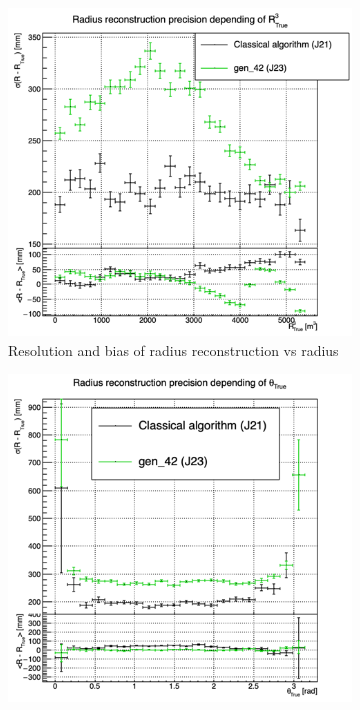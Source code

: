 \documentclass[../main.tex]{subfiles}
\begin{document}
\begin{figure}[ht]
  \begin{subfigure}[t]{0.32\linewidth}
    \centering
    \includegraphics[width=\linewidth]{images/jcnn/vic_cnn/multi_vic_42_MSBvRTC.png}
    \caption{Resolution and bias of radius reconstruction vs radius}
    \label{fig:jcnn:vic_cnn:multi_vic_42_MSBvRTC}
  \end{subfigure}
  \begin{subfigure}[t]{0.32\linewidth}
    \centering
    \includegraphics[width=\linewidth]{images/jcnn/vic_cnn/multi_vic_42_MSBvTTC.png}

\end{subfigure}
\end{figure}
\end{document}
